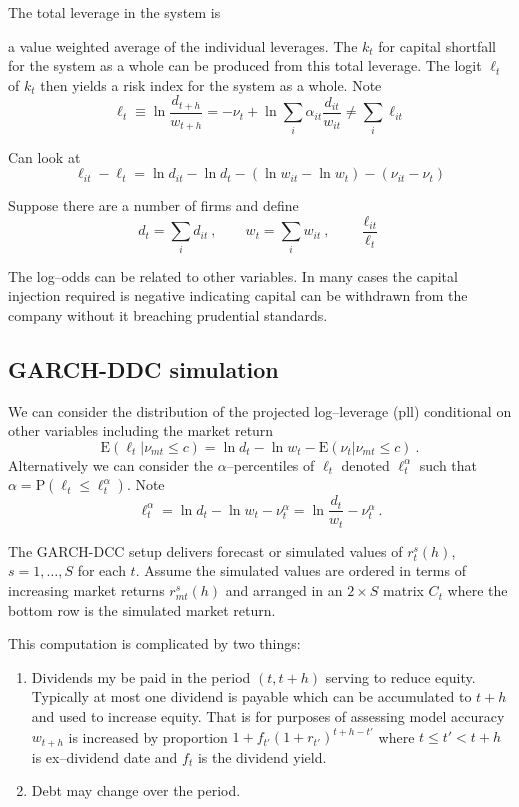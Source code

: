 \documentclass[authoryear]{elsarticle}
\newcommand{\E}{\mathrm{E}}
\newcommand{\cq}{\ , \qquad}
\renewcommand{\P}{\mathrm{P}}
\begin{document}
The total leverage in the system is

a value weighted average of the individual leverages.   The $k_t$ for  capital shortfall for the system as a whole can be
produced from this total leverage.   The logit $\ell_t$ of $k_t$ then yields a risk index for the system as a whole.  Note
$$
\ell_t \equiv \ln \frac{d_{t+h}}{w_{t+h}}=-\nu_t+\ln \sum_i\alpha_{it}\frac{ d_{it}}{ w_{it}}\ne \sum_i \ell_{it}
$$

Can look at
$$
\ell_{it}-\ell_t  = \ln d_{it}-\ln d_t - (\ln w_{it}-\ln w_t) - (\nu_{it}-\nu_t)
$$

Suppose there are a number of firms and define
$$
d_t=\sum_i d_{it}\cq w_t=\sum_i w_{it} \cq  \frac{\ell_{it}}{\ell_t}
$$



The log--odds can be related to other variables.  In many cases the capital injection required is negative indicating capital can be withdrawn from the company without it breaching prudential standards.




\subsection{GARCH-DDC simulation}

We can consider the distribution of the projected log--leverage (pll) conditional on other variables including the market return
$$
\E(\ell_t|\nu_{mt}\le c)  = \ln d_t -\ln w_t -\E(\nu_t|\nu_{mt}\le c)\ .
$$
Alternatively we can consider the  $\alpha$--percentiles of $\ell_t$ denoted $\ell^\alpha_t$ such that
$
\alpha=\P(\ell_t\le \ell_t^\alpha)
$.  Note
$$
\ell_t^\alpha = \ln d_t -\ln w_t -\nu_t^\alpha = \ln \frac{d_t}{w_t}-\nu_t^\alpha\  .
$$

The GARCH-DCC setup delivers forecast or simulated values of $r^s_{t}(h)$, $s=1,\ldots, S$  for each  $t$.      Assume the simulated values are ordered in terms of increasing market returns $r^s_{mt}(h)$ and arranged in an $2\times S$ matrix $C_t$ where  the bottom row is the simulated market return.

This computation is complicated by two things:
\begin{enumerate}
\item  Dividends my be paid  in the period $(t, t+h)$ serving to reduce equity.  Typically at most one dividend  is payable which can be accumulated to  $t+h$ and used to increase equity.   That is for purposes of  assessing model accuracy $w_{t+h}$ is increased by proportion $1+f_{t'}(1+r_{t'})^{t+h-t'}$ where $t\le t'<t+h$ is  ex--dividend date and $f_t$ is the dividend yield.
\item  Debt may change over the period.
\end{enumerate}
\end{document}
